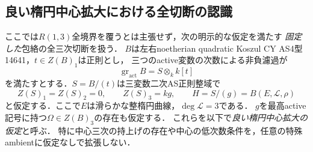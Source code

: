 \subsection{良い楕円中心拡大における全切断の認識}
\label{sec:r13-all-cut-reduction}
ここでは$R(1,3)$全境界を覆うとは主張せず，次の明示的な仮定を満たす
\emph{固定した}包絡の全三次切断を扱う．
$B$は左右noetherian quadratic Koszul CY AS4型14641，$t\in Z(B)_1$は正則とし，
三つのactive変数の次数による非負濾過が
\[
 \operatorname{gr}_{\mathrm{act}}B=S\otimes_k k[t]
\]
を満たすとする．$S=B/(t)$は三変数二次AS正則整域で
\[
 Z(S)_1=Z(S)_2=0,\qquad Z(S)_3=kg,
 \qquad H=S/(g)=B(E,\mathcal L,\rho)
\]
と仮定する．ここで$E$は滑らかな整楕円曲線，$\deg\mathcal L=3$である．
$g$を最高active記号に持つ$\Omega\in Z(B)_3$の存在も仮定する．
これらを以下で\emph{良い楕円中心拡大の仮定}と呼ぶ．
特に中心三次の持上げの存在や中心の低次数条件を，任意の特殊ambientに仮定なしで拡張しない．


